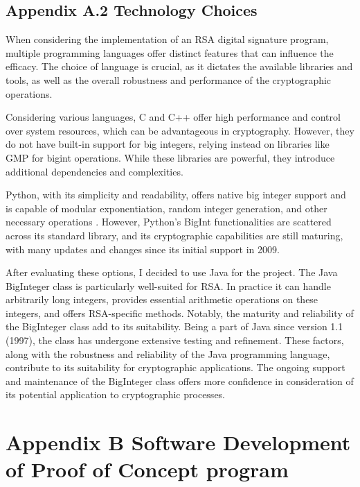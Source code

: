 \documentclass[]{final_report}
\theoremstyle{definition}
\begin{document}
\section{Appendix A.2 Technology Choices}
When considering the implementation of an RSA digital signature program, multiple programming languages offer distinct features that can influence the efficacy. The choice of language is crucial, as it dictates the available libraries and tools, as well as the overall robustness and performance of the cryptographic operations.

Considering various languages, C and C++ offer high performance and control over system resources, which can be advantageous in cryptography. However, they do not have built-in support for big integers, relying instead on libraries like GMP \cite{GMP} for bigint operations. While these libraries are powerful, they introduce additional dependencies and complexities.

Python, with its simplicity and readability, offers native big integer support and is capable of modular exponentiation, random integer generation, and other necessary operations  \cite{python3lib} . However, Python's BigInt functionalities are scattered across its standard library, and its cryptographic capabilities are still maturing, with many updates and changes since its initial support in 2009. 

After evaluating these options, I decided to use Java for the project. The Java BigInteger class \cite{BigIntegerJDK21} is particularly well-suited for RSA. In practice it can handle arbitrarily long integers, provides essential arithmetic operations on these integers, and offers RSA-specific methods. Notably, the maturity and reliability of the BigInteger class add to its suitability. Being a part of Java since version 1.1 (1997), the class has undergone extensive testing and refinement. These factors, along with the robustness and reliability of the Java programming language, contribute to its suitability for cryptographic applications. The ongoing support and maintenance of the BigInteger class offers more confidence in consideration of its potential application to cryptographic processes. 



\chapter{Appendix B Software Development of Proof of Concept program}
\end{document}
